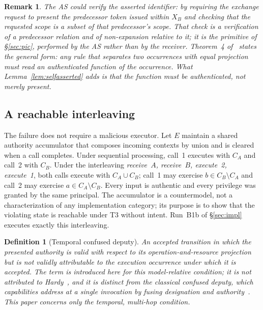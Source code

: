 \documentclass[conference]{IEEEtran}
\newtheorem{definition}{Definition}
\newtheorem{remark}{Remark}
\begin{document}
\begin{remark}
The AS \emph{could} verify the asserted identifier: by requiring the exchange request to present the predecessor token issued within $X_B$ and checking that the requested scope is a subset of that predecessor's scope. That check is a verification of a predecessor relation and of non-expansion relative to it; it is the primitive of \S\ref{sec:pic}, performed by the AS rather than by the receiver. Theorem~4 of~\cite{gallo2026poc} states the general form: any rule that separates two occurrences with equal projection must read an authenticated function of the occurrence. What Lemma~\ref{lem:selfasserted} adds is that the function must be \emph{authenticated}, not merely present.
\end{remark}

\subsection{A reachable interleaving}
The failure does not require a malicious executor. Let $E$ maintain a shared authority accumulator that composes incoming contexts by union and is cleared when a call completes. Under sequential processing, call~1 executes with $C_A$ and call~2 with $C_B$. Under the interleaving \emph{receive~$A$, receive~$B$, execute~2, execute~1}, both calls execute with $C_A\cup C_B$; call~1 may exercise $b\in C_B\setminus C_A$ and call~2 may exercise $a\in C_A\setminus C_B$. Every input is authentic and every privilege was granted by the same principal. The accumulator is a countermodel, not a characterization of any implementation category; its purpose is to show that the violating state is reachable under T3 without intent. Run~B1b of \S\ref{sec:impl} executes exactly this interleaving.

\begin{definition}[Temporal confused deputy]\label{def:tcd}
An accepted transition in which the presented authority is valid with respect to its operation-and-resource projection but is not validly attributable to the execution occurrence under which it is accepted. The term is introduced here for this model-relative condition; it is not attributed to Hardy~\cite{hardy1988}, and it is distinct from the classical confused deputy, which capabilities address at a single invocation by fusing designation and authority~\cite{miller2003,spiessens2007}. This paper concerns only the temporal, multi-hop condition.
\end{definition}
\end{document}
